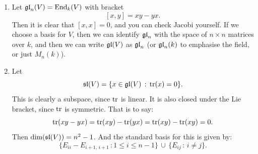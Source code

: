 \documentclass{article}
\begin{document}
\begin{enumerate}
    \item[(a)] Let $\mathfrak{gl}_{n}(V) = \operatorname{End}_{k}(V)$ with bracket \[
    [x,y]=xy-yx. \]
    Then it is clear that $[x,x]=0$, and you can check Jacobi yourself. \gap If we choose a basis for $V$, then we can identify $\mathfrak{gl}_{n}$ with the space of $n\times n$ matrices over $k$, and then we can write $\mathfrak{gl}(V)$ as $\mathfrak{gl}_{n}$ (or $\mathfrak{gl}_{n}(k)$ to emphasise the field, or just $M_{n}(k)$).
    \item[(b)] Let \[ \mathfrak{sl}(V) = \{ x \in \mathfrak{gl}(V) \, : \, \tr(x)=0 \}. \] This is clearly a subspace, since $\tr$ is linear. It is also closed under the Lie bracket, since $\tr$ is symmetric. That is to say:
    \[ \tr(xy-yx) = \tr(xy)-\tr(yx) = \tr(xy) - \tr(xy) = 0. \] Then $\dim(\mathfrak{sl}(V)) = n^{2}-1$. And the standard basis for this is given by:
    \[ \{E_{ii} - E_{i+1,\, i+1} \,: 1 \leq i \leq n-1 \} \, \cup \, \{E_{ij} \, : \, i \neq j\}.  \]













    \newlec






\end{enumerate}
\end{document}
